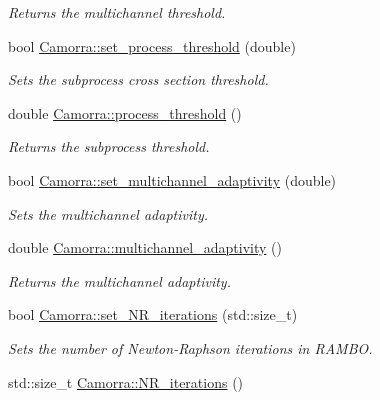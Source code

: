 \begin{DoxyCompactItemize}
\begin{DoxyCompactList}\small\item\em Returns the multichannel threshold. \end{DoxyCompactList}\item 
\hypertarget{a00829_ad948e666ecd83f1c578d34a579cc5312}{
bool \hyperlink{a00829_ad948e666ecd83f1c578d34a579cc5312}{Camorra::set\_\-process\_\-threshold} (double)}
\label{a00829_ad948e666ecd83f1c578d34a579cc5312}

\begin{DoxyCompactList}\small\item\em Sets the subprocess cross section threshold. \end{DoxyCompactList}\item 
double \hyperlink{a00829_aed082a9b724d627f7563c76fa9c58824}{Camorra::process\_\-threshold} ()
\begin{DoxyCompactList}\small\item\em Returns the subprocess threshold. \end{DoxyCompactList}\item 
\hypertarget{a00829_a7c523c66223d4c95a3643a4edfde68ef}{
bool \hyperlink{a00829_a7c523c66223d4c95a3643a4edfde68ef}{Camorra::set\_\-multichannel\_\-adaptivity} (double)}
\label{a00829_a7c523c66223d4c95a3643a4edfde68ef}

\begin{DoxyCompactList}\small\item\em Sets the multichannel adaptivity. \end{DoxyCompactList}\item 
\hypertarget{a00829_a8a3cd9f4acc73ceff9a10603cf104557}{
double \hyperlink{a00829_a8a3cd9f4acc73ceff9a10603cf104557}{Camorra::multichannel\_\-adaptivity} ()}
\label{a00829_a8a3cd9f4acc73ceff9a10603cf104557}

\begin{DoxyCompactList}\small\item\em Returns the multichannel adaptivity. \end{DoxyCompactList}\item 
bool \hyperlink{a00829_a3710f88bf2e06b4efacb54c3b6617e97}{Camorra::set\_\-NR\_\-iterations} (std::size\_\-t)
\begin{DoxyCompactList}\small\item\em Sets the number of Newton-\/Raphson iterations in RAMBO. \end{DoxyCompactList}\item 
\hypertarget{a00829_a26ad4e0b5a59c164e61f5abfec49b85f}{
std::size\_\-t \hyperlink{a00829_a26ad4e0b5a59c164e61f5abfec49b85f}{Camorra::NR\_\-iterations} ()}
\label{a00829_a26ad4e0b5a59c164e61f5abfec49b85f}


\end{DoxyCompactItemize}
